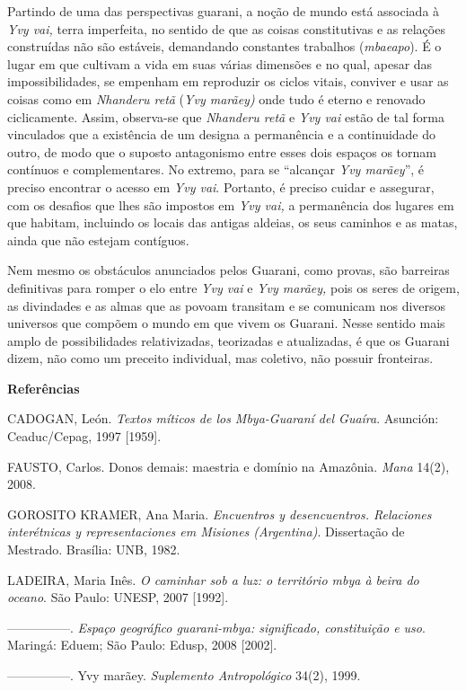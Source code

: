 Partindo de uma das perspectivas guarani, a noção de mundo está
associada à \emph{Yvy vai,} terra imperfeita, no sentido de que as
coisas constitutivas e as relações construídas não são estáveis,
demandando constantes trabalhos (\emph{mbaeapo}). É o lugar em que
cultivam a vida em suas várias dimensões e no qual, apesar das
impossibilidades, se empenham em reproduzir os ciclos vitais, conviver e
usar as coisas como em \emph{Nhanderu retã} (\emph{Yvy marãey)} onde
tudo é eterno e renovado ciclicamente. Assim, observa-se que
\emph{Nhanderu retã} e \emph{Yvy vai} estão de tal forma vinculados que
a existência de um designa a permanência e a continuidade do outro, de
modo que o suposto antagonismo entre esses dois espaços os tornam
contínuos e complementares. No extremo, para se ``alcançar \emph{Yvy
marãey}'', é preciso encontrar o acesso em \emph{Yvy vai}. Portanto, é
preciso cuidar e assegurar, com os desafios que lhes são impostos em
\emph{Yvy vai,} a permanência dos lugares em que habitam, incluindo os
locais das antigas aldeias, os seus caminhos e as matas, ainda que não
estejam contíguos.

Nem mesmo os obstáculos anunciados pelos Guarani, como provas, são
barreiras definitivas para romper o elo entre \emph{Yvy vai} e \emph{Yvy
marãey,} pois os seres de origem, as divindades e as almas que as povoam
transitam e se comunicam nos diversos universos que compõem o mundo em
que vivem os Guarani. Nesse sentido mais amplo de possibilidades
relativizadas, teorizadas e atualizadas, é que os Guarani dizem, não
como um preceito individual, mas coletivo, não possuir fronteiras.

\textbf{Referências}

CADOGAN, León. \emph{Textos míticos de los Mbya-Guaraní del Guaíra}.
Asunción: Ceaduc/Cepag, 1997 {[}1959{]}.

FAUSTO, Carlos. Donos demais: maestria e domínio na Amazônia.
\emph{Mana} 14(2), 2008.

GOROSITO KRAMER, Ana Maria. \emph{Encuentros y desencuentros. Relaciones
interétnicas y representaciones em Misiones (Argentina)}. Dissertação de
Mestrado. Brasília: UNB, 1982.

LADEIRA, Maria Inês. \emph{O caminhar sob a luz: o território mbya à
beira do oceano}. São Paulo: UNESP, 2007 {[}1992{]}.

---------------. \emph{Espaço geográfico guarani-mbya: significado,
constituição e uso}. Maringá: Eduem; São Paulo: Edusp, 2008 {[}2002{]}.

---------------. Yvy marãey. \emph{Suplemento Antropológico} 34(2),
1999.

